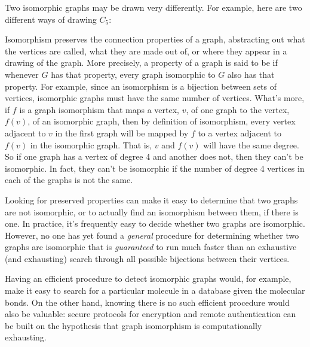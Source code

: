 Two isomorphic graphs may be drawn very differently.  For example, here
are two different ways of drawing $C_5$:


Isomorphism preserves the connection properties of a graph, abstracting out what the
vertices are called, what they are made out of, or where they appear in a drawing of
the graph.  More precisely, a property of a graph is said to be  if whenever $G$ has that property, every graph isomorphic to $G$ also has
that property.  For example, since an isomorphism is a bijection between sets of
vertices, isomorphic graphs must have the same number of vertices.  What's more, if $f$
is a graph isomorphism that maps a vertex, $v$, of one graph to the vertex, $f(v)$, of
an isomorphic graph, then by definition of isomorphism, every vertex adjacent to $v$ in
the first graph will be mapped by $f$ to a vertex adjacent to $f(v)$ in the isomorphic
graph.  That is, $v$ and $f(v)$ will have the same degree.  So if one graph has a
vertex of degree 4 and another does not, then they can't be isomorphic.  In fact, they
can't be isomorphic if the number of degree 4 vertices in each of the graphs is not the
same.

Looking for preserved properties can make it easy to determine that
two graphs are not isomorphic, or to actually find an isomorphism
between them, if there is one.  In practice, it's frequently easy to
decide whether two graphs are isomorphic.  However, no one has yet
found a
\emph{general} procedure for determining whether two graphs are isomorphic
that is \emph{guaranteed} to run much faster than an exhaustive (and
exhausting) search through all possible bijections between their
vertices.

Having an efficient procedure to detect isomorphic graphs would, for
example, make it easy to search for a particular molecule in a database
given the molecular bonds.  On the other hand, knowing there is no such
efficient procedure would also be valuable: secure protocols for
encryption and remote authentication can be built on the hypothesis that
graph isomorphism is computationally exhausting.

\begin{problems}
\classproblems
{}

\homeworkproblems
{}

\examproblems
{}
\end{problems}


